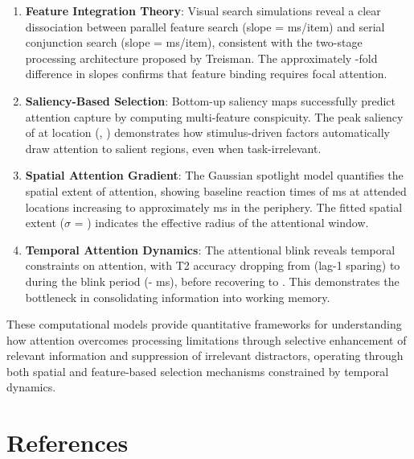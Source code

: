\documentclass[a4paper, 11pt]{article}
\begin{document}
\begin{enumerate}
\item \textbf{Feature Integration Theory}: Visual search simulations reveal a clear dissociation between parallel feature search (slope =  ms/item) and serial conjunction search (slope =  ms/item), consistent with the two-stage processing architecture proposed by Treisman. The approximately -fold difference in slopes confirms that feature binding requires focal attention.

\item \textbf{Saliency-Based Selection}: Bottom-up saliency maps successfully predict attention capture by computing multi-feature conspicuity. The peak saliency of  at location (, ) demonstrates how stimulus-driven factors automatically draw attention to salient regions, even when task-irrelevant.

\item \textbf{Spatial Attention Gradient}: The Gaussian spotlight model quantifies the spatial extent of attention, showing baseline reaction times of  ms at attended locations increasing to approximately  ms in the periphery. The fitted spatial extent ($\sigma$ = ) indicates the effective radius of the attentional window.

\item \textbf{Temporal Attention Dynamics}: The attentional blink reveals temporal constraints on attention, with T2 accuracy dropping from  (lag-1 sparing) to  during the blink period (- ms), before recovering to . This demonstrates the bottleneck in consolidating information into working memory.
\end{enumerate}

These computational models provide quantitative frameworks for understanding how attention overcomes processing limitations through selective enhancement of relevant information and suppression of irrelevant distractors, operating through both spatial and feature-based selection mechanisms constrained by temporal dynamics.

\section*{References}
\end{document}
